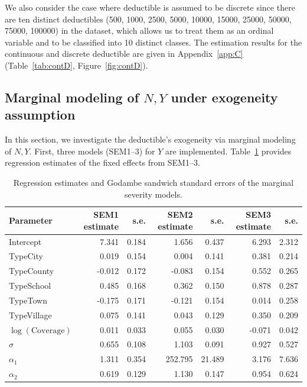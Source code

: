 We also consider the case where deductible is assumed to be discrete since there are ten distinct deductibles (500, 1000, 2500, 5000, 10000, 15000, 25000, 50000, 75000, 100000) in the dataset, which allows us to treat them as an ordinal variable and to be classified into 10 distinct classes. The estimation results for the continuous and discrete deductible are given in Appendix~\ref{app:C} (Table~\ref{tab:contD}, Figure~\ref{fig:contD}).

\subsection{Marginal modeling of $N, Y$ under exogeneity assumption}
\label{section:marginalNY}

In this section, we investigate the deductible's exogeneity via marginal modeling of $N, Y$. First, three models (SEM1--3) for $Y$ are implemented. Table~\ref{marginalY} provides regression estimates of the fixed effects from SEM1--3. 


\begin{table}[h!]
\centering
\begin{tabular}{lrrrrrr}
\toprule
Parameter & SEM1 estimate & s.e. & SEM2 estimate & s.e. & SEM3 estimate & s.e. \\
\midrule
Intercept & 7.341 & 0.184 & 1.656 & 0.437 & 6.293 & 2.312 \\
TypeCity & 0.019 & 0.154 & 0.004 & 0.141 & 0.381 & 0.214 \\
TypeCounty & -0.012 & 0.172 & -0.083 & 0.154 & 0.552 & 0.265 \\
TypeSchool & 0.485 & 0.168 & 0.362 & 0.150 & 0.878 & 0.287 \\
TypeTown & -0.175 & 0.171 & -0.121 & 0.154 & 0.014 & 0.258 \\
TypeVillage & 0.075 & 0.141 & 0.043 & 0.129 & 0.350 & 0.209 \\
$\log(\mathrm{Coverage})$ & 0.011 & 0.033 & 0.055 & 0.030 & -0.071 & 0.042 \\
$\sigma$ & 0.655 & 0.108 & 1.103 & 0.091 & 0.927 & 0.527 \\
$\alpha_1$ & 1.311 & 0.354 & 252.795 & 21.489 & 3.176 & 7.636 \\
$\alpha_2$ & 0.619 & 0.129 & 1.130 & 0.147 & 0.954 & 0.624 \\
\bottomrule
\end{tabular}
\caption{Regression estimates and Godambe sandwich standard errors of the marginal severity models.}
\label{marginalY}
\end{table}

